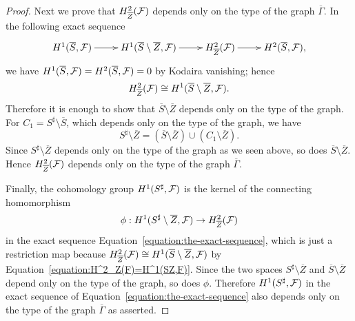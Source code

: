 \documentclass[a4paper, reqno, twoside]{amsart}
\theoremstyle{definition}
\numberwithin{equation}{section}
\begin{document}
\begin{proof}
Next we prove that $H^2_{\overline{Z}}({\ensuremath \mathcal{F}})$ depends only
on the type of the graph $\overline{\Gamma}$. In the following exact
sequence
    \begin{equation*}
    \xymatrix{ H^1(\overline{S}, {\ensuremath \mathcal{F}}) \ar[r] & H^1(\overline{S}
      \setminus \overline{Z}, {\ensuremath \mathcal{F}}) \ar[r] &
      H^2_{\overline{Z}}({\ensuremath \mathcal{F}}) \ar[r] & H^2(\overline{S},
      {\ensuremath \mathcal{F}}),}
    \end{equation*}
we have $H^1(\overline{S}, {\ensuremath \mathcal{F}})=H^2(\overline{S}, {\ensuremath \mathcal{F}})=0$ by
Kodaira vanishing; hence
    \begin{equation}\label{equation:H^2_Z(F)=H^1(SZ,F)}
    H^2_{\overline{Z}}({\ensuremath \mathcal{F}}) \cong H^1(\overline{S} \setminus \overline{Z}, {\ensuremath \mathcal{F}}).
    \end{equation}
Therefore it is enough to show that $\overline{S} \setminus
\overline{Z}$ depends only on the type of the graph. For
$C_1=S^{\sharp} \setminus \overline{S}$, which depends only on the type
of the graph, we have
    \begin{equation*}
    S^{\sharp} \setminus \overline{Z} = (\overline{S} \setminus \overline{Z}) \cup (C_1 \setminus \overline{Z}).
    \end{equation*}
Since $S^{\sharp} \setminus \overline{Z}$ depends only on the type of the
graph as we seen above, so does $\overline{S} \setminus \overline{Z}$. Hence
$H^2_{\overline{Z}}({\ensuremath \mathcal{F}})$ depends only on the type of the graph $\overline{\Gamma}$.

Finally, the cohomology group $H^1(S^{\sharp}, {\ensuremath \mathcal{F}})$ is the kernel of the connecting homomorphism
    \begin{equation*}
    \phi: H^1(S^{\sharp} \setminus \overline{Z}, {\ensuremath \mathcal{F}}) \to
    H^2_{\overline{Z}}({\ensuremath \mathcal{F}})
    \end{equation*}
in the exact sequence Equation~\eqref{equation:the-exact-sequence},
which is just a restriction map because $H^2_{\overline{Z}}({\ensuremath \mathcal{F}})
\cong H^1(\overline{S} \setminus \overline{Z}, {\ensuremath \mathcal{F}})$ by
Equation~\eqref{equation:H^2_Z(F)=H^1(SZ,F)}. Since the two spaces
$S^{\sharp} \setminus \overline{Z}$ and $\overline{S} \setminus
\overline{Z}$ depend only on the type of the graph, so does
$\phi$. Therefore $H^1(S^{\sharp}, {\ensuremath \mathcal{F}})$ in the exact sequence
of Equation~\eqref{equation:the-exact-sequence} also depends only on
the type of the graph $\overline{\Gamma}$ as asserted.
\end{proof}
\end{document}
